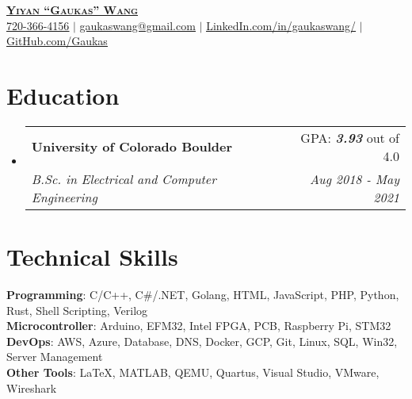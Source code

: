 \documentclass[letterpaper,11pt]{article}
\makeatletter
\newcommand{\resumeSubheading}[4]{
  \vspace{-2pt}\item
    \begin{tabular*}{0.97\textwidth}[t]{l@{\extracolsep{\fill}}r}
      \textbf{#1} & #2 \\
      \textit{\small#3} & \textit{\small #4} \\
    \end{tabular*}\vspace{-7pt}
}
\newcommand{\resumeSubHeadingListStart}{\begin{itemize}[leftmargin=0.15in, label={}]}
\newcommand{\resumeSubHeadingListEnd}{\end{itemize}}
\makeatother
\begin{document}

\begin{center}
  \href{https://gaukas.wang}{\textbf{\Huge \scshape Yiyan ``Gaukas'' Wang}} \\ \vspace{1pt}
    \href{tel:720-366-4156}{\underline{720-366-4156}} $|$
    \href{mailto:gaukaswang@gmail.com}{\underline{gaukaswang@gmail.com}} $|$ 
    \href{https://www.linkedin.com/in/gaukaswang/}{\underline{LinkedIn.com/in/gaukaswang/}} $|$
    \href{https://github.com/Gaukas}{\underline{GitHub.com/Gaukas}}
\end{center}


\section{Education}
  \resumeSubHeadingListStart
    \resumeSubheading
      {University of Colorado Boulder}{GPA: \textbf{\textit{3.93}} out of 4.0}
      {B.Sc. in Electrical and Computer Engineering}{Aug 2018 - May 2021}
  \resumeSubHeadingListEnd

  \vspace{1pt}

\section{Technical Skills}
 \begin{itemize}[leftmargin=0.15in, label={}]
    \small{\item{
     \textbf{Programming}{: C/C++, C\#/.NET, Golang, HTML, JavaScript, PHP, Python, Rust, Shell Scripting, Verilog} \\
     \textbf{Microcontroller}{: Arduino, EFM32, Intel FPGA, PCB, Raspberry Pi, STM32} \\
     \textbf{DevOps}{: AWS, Azure, Database, DNS, Docker, GCP, Git, Linux, SQL, Win32, Server Management} \\
     \textbf{Other Tools}{: \LaTeX, MATLAB, QEMU, Quartus, Visual Studio, VMware, Wireshark}
    }}
 \end{itemize}
\end{document}
